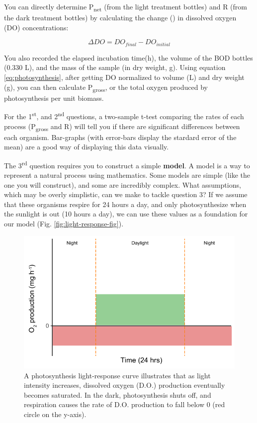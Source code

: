 \documentclass[]{krantz}
\theoremstyle{definition}
\theoremstyle{definition}
\theoremstyle{definition}
\theoremstyle{remark}
\begin{document}
You can directly determine P\textsubscript{net} (from the light
treatment bottles) and R (from the dark treatment bottles) by
calculating the change (\textDelta) in dissolved oxygen (DO)
concentrations:

\begin{equation}
\Delta{}DO = DO_{final} - DO_{initial}
\label{eq:delta}
\end{equation}

You also recorded the elapsed incubation time(\textDelta{}h), the volume
of the BOD bottles (0.330 L), and the mass of the sample (in dry weight,
g). Using equation \eqref{eq:photosynthesis}, after getting \textDelta{}DO
normalized to volume (L) and dry weight (g), you can then calculate
P\textsubscript{gross}, or the total oxygen produced by photosynthesis
per unit biomass.

For the 1\textsuperscript{st}, and 2\textsuperscript{nd} questions, a
two-sample t-test comparing the rates of each process
(P\textsubscript{gross} and R) will tell you if there are significant
differences between each organism. Bar-graphs (with error-bars display
the stardard error of the mean) are a good way of displaying this data
visually.

The 3\textsuperscript{rd} question requires you to construct a simple
\textbf{model}. A model is a way to represent a natural process using
mathematics. Some models are simple (like the one you will construct),
and some are incredibly complex. What assumptions, which may be overly
simplistic, can we make to tackle question 3? If we assume that these
organisms respire for 24 hours a day, and only photosynthesize when the
sunlight is out (10 hours a day), we can use these values as a
foundation for our model (Fig. \ref{fig:light-response-fig}).

\begin{figure}
\centering
\includegraphics{chapter_materials/physiological_ecology/photo_model.pdf}
\caption{\label{fig:photo-model}A photosynthesis light-response curve
illustrates that as light intensity increases, dissolved oxygen (D.O.)
production eventually becomes saturated. In the dark, photosynthesis
shuts off, and respiration causes the rate of D.O. production to fall
below 0 (red circle on the y-axis).}
\end{figure}
\end{document}
